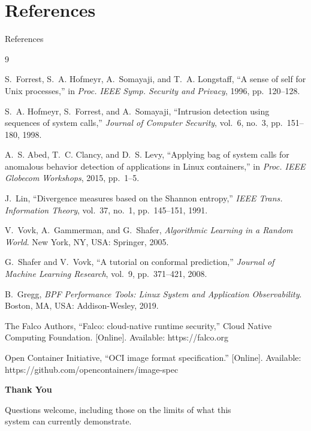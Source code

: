 \documentclass[aspectratio=169, 11pt]{beamer}
\begin{document}
\section{References}
%     
%     
\begin{frame}[allowframebreaks]{References}
\scriptsize
\begin{thebibliography}{9}

S.~Forrest, S.~A. Hofmeyr, A.~Somayaji, and T.~A. Longstaff,
``A sense of self for Unix processes,''
in \emph{Proc. IEEE Symp. Security and Privacy}, 1996, pp.~120--128.

S.~A. Hofmeyr, S.~Forrest, and A.~Somayaji,
``Intrusion detection using sequences of system calls,''
\emph{Journal of Computer Security}, vol.~6, no.~3, pp.~151--180, 1998.

A.~S. Abed, T.~C. Clancy, and D.~S. Levy,
``Applying bag of system calls for anomalous behavior detection of applications
in Linux containers,''
in \emph{Proc. IEEE Globecom Workshops}, 2015, pp.~1--5.

J.~Lin,
``Divergence measures based on the Shannon entropy,''
\emph{IEEE Trans. Information Theory}, vol.~37, no.~1, pp.~145--151, 1991.

V.~Vovk, A.~Gammerman, and G.~Shafer,
\emph{Algorithmic Learning in a Random World}.
New York, NY, USA: Springer, 2005.

G.~Shafer and V.~Vovk,
``A tutorial on conformal prediction,''
\emph{Journal of Machine Learning Research}, vol.~9, pp.~371--421, 2008.

B.~Gregg,
\emph{BPF Performance Tools: Linux System and Application Observability}.
Boston, MA, USA: Addison-Wesley, 2019.

The Falco Authors,
``Falco: cloud-native runtime security,''
Cloud Native Computing Foundation. [Online]. Available: https://falco.org

Open Container Initiative,
``OCI image format specification.'' [Online].
Available: https://github.com/opencontainers/image-spec

\end{thebibliography}
\end{frame}

\begin{frame}
    \centering
    {\Huge \textbf{\textcolor{amritaMaroon}{Thank You}}}

    \vspace{6mm}
    {\footnotesize Questions welcome, including those on the limits of what this\\
    system can currently demonstrate.}
\end{frame}
\end{document}
